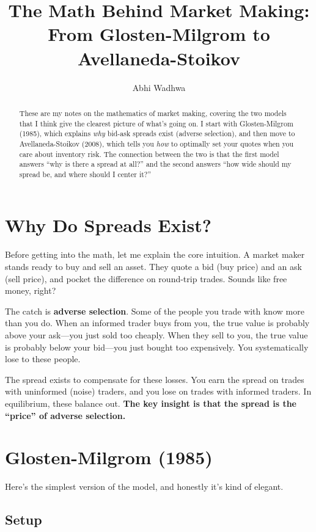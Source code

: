 \documentclass[11pt]{article}
\title{The Math Behind Market Making:\\From Glosten-Milgrom to Avellaneda-Stoikov}
\author{Abhi Wadhwa}
\date{}
\begin{document}
\maketitle

\begin{abstract}
These are my notes on the mathematics of market making, covering the two models that I think give the clearest picture of what's going on. I start with Glosten-Milgrom (1985), which explains \emph{why} bid-ask spreads exist (adverse selection), and then move to Avellaneda-Stoikov (2008), which tells you \emph{how} to optimally set your quotes when you care about inventory risk. The connection between the two is that the first model answers ``why is there a spread at all?'' and the second answers ``how wide should my spread be, and where should I center it?''
\end{abstract}

\section{Why Do Spreads Exist?}

Before getting into the math, let me explain the core intuition. A market maker stands ready to buy and sell an asset. They quote a bid (buy price) and an ask (sell price), and pocket the difference on round-trip trades. Sounds like free money, right?

The catch is \textbf{adverse selection}. Some of the people you trade with know more than you do. When an informed trader buys from you, the true value is probably above your ask---you just sold too cheaply. When they sell to you, the true value is probably below your bid---you just bought too expensively. You systematically lose to these people.

The spread exists to compensate for these losses. You earn the spread on trades with uninformed (noise) traders, and you lose on trades with informed traders. In equilibrium, these balance out. \textbf{The key insight is that the spread is the ``price'' of adverse selection.}

\section{Glosten-Milgrom (1985)}

Here's the simplest version of the model, and honestly it's kind of elegant.

\subsection{Setup}
\end{document}
